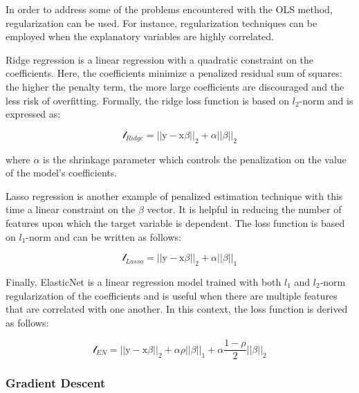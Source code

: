 \documentclass[
]{book}
\begin{document}
In order to address some of the problems encountered with the OLS method, regularization can be used. For instance, regularization techniques can be employed when the explanatory variables are highly correlated.

Ridge regression is a linear regression with a quadratic constraint on the coefficients. Here, the coefficients minimize a penalized residual sum of squares: the higher the penalty term, the more large coefficients are discouraged and the less risk of overfitting. Formally, the ridge loss function is based on \(l_2\)-norm and is expressed as:

\begin{equation}
  \mathcal{l}_{Ridge} = ||\mathrm{y} - \pmb{\mathrm{x}}\beta||_2 + \alpha ||\beta||_2
  \label{eq:ridge}
\end{equation}

where \(\alpha\) is the shrinkage parameter which controls the penalization on the value of the model's coefficients.

Lasso regression is another example of penalized estimation technique with this time a linear constraint on the \(\beta\) vector. It is helpful in reducing the number of features upon which the target variable is dependent. The loss function is based on \(l_1\)-norm and can be written as follows:

\begin{equation}
  \mathcal{l}_{Lasso} = ||\mathrm{y} - \pmb{\mathrm{x}}\beta||_2 + \alpha ||\beta||_1
  \label{eq:lasso}
\end{equation}

Finally, ElasticNet is a linear regression model trained with both \(l_1\) and \(l_2\)-norm regularization of the coefficients and is useful when there are multiple features that are correlated with one another. In this context, the loss function is derived as follows:

\begin{equation}
  \mathcal{l}_{EN} = ||\mathrm{y} - \pmb{\mathrm{x}}\beta||_2 + \alpha \rho ||\beta||_1 + \alpha \frac{1-\rho}{2} ||\beta||_2
  \label{eq:elasticnet}
\end{equation}

\hypertarget{gradient-descent}{%
\subsubsection*{Gradient Descent}\label{gradient-descent}}
\end{document}
